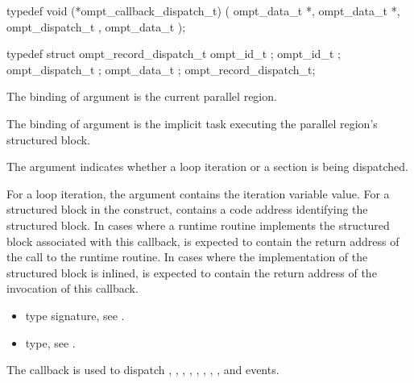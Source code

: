 \begin{ccppspecific}
\begin{omptCallback}
typedef void (*ompt_callback_dispatch_t) (
  ompt_data_t *,
  ompt_data_t *,
  ompt_dispatch_t ,
  ompt_data_t  
);
\end{omptCallback}
\end{ccppspecific}


\record

\begin{ccppspecific}
\begin{omptRecord}
typedef struct ompt_record_dispatch_t {
  ompt_id_t ;
  ompt_id_t ;
  ompt_dispatch_t ;
  ompt_data_t ; 
} ompt_record_dispatch_t;
\end{omptRecord}
\end{ccppspecific}


\argdesc

The binding of argument  is the current
parallel region.

The binding of argument  is the implicit task
executing the parallel region's structured block.

The argument  indicates whether a loop iteration or a
section is being dispatched.

For a loop iteration, the argument  contains
the iteration variable value.  
For a structured block in the  construct, 
contains a code address identifying the structured block.  In cases where a
runtime routine implements the structured block associated with this callback,
 is expected to contain the return address of the
call to the runtime routine.  In cases where the implementation of
the structured block is inlined,  is expected to contain
the return address of the invocation of this callback.

\crossreferences
\begin{itemize}
\item {} type signature, see
  .
\item {} type, see
  .
\end{itemize}



\label{sec:ompt_callback_target_t}
\summary
The  callback is used to dispatch
, ,
, ,
, ,
, ,
 and  events.

